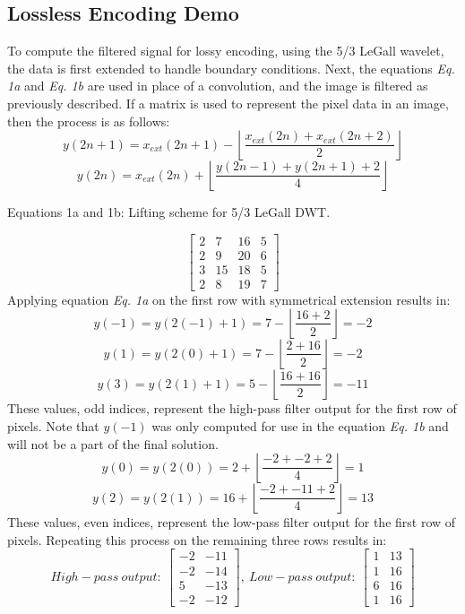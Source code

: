 \documentclass{article}
\begin{document}
\subsection{Lossless Encoding Demo}
To compute the filtered signal for lossy encoding, using the 5/3 LeGall wavelet, the data is first extended to handle boundary conditions. Next, the equations \textit{Eq. 1a} and \textit{Eq. 1b} are used in place of a convolution, and the image is filtered as previously described. If a matrix is used to represent the pixel data in an image, then the process is as follows: 
\[y(2n+1)=x_{ext}(2n+1)-\left\lfloor \frac{x_{ext}(2n)+x_{ext}(2n+2)}{2} \right\rfloor \tag{3}\]
\[y(2n)=x_{ext}(2n)+\left\lfloor \frac{y(2n-1)+y(2n+1)+2}{4} \right\rfloor \tag{3}\]
\begin{center}
    Equations 1a and 1b: Lifting scheme for 5/3 LeGall DWT.
\end{center}

\[
\begin{bmatrix}
2 & 7 & 16 & 5\\
2 & 9 & 20 & 6\\
3 & 15 & 18 & 5\\
2 & 8 & 19 & 7
\end{bmatrix}
\]
Applying equation \textit{Eq. 1a} on the first row with symmetrical extension results in:
\[
y(-1) = y(2(-1)+1)= 7-\left\lfloor \frac{16+2}{2} \right\rfloor = -2
\]
\[
y(1)=y(2(0)+1)=7-\left\lfloor \frac{2+16}{2} \right\rfloor = -2
\]
\[
y(3)=y(2(1)+1)=5-\left\lfloor \frac{16+16}{2} \right\rfloor = -11
\]
These values, odd indices, represent the high-pass filter output for the first row of pixels. Note that $y(-1)$ was only computed for use in the equation \textit{Eq. 1b} and will not be a part of the final solution. 
\[
y(0)=y(2(0)) = 2+ \left\lfloor \frac{-2+-2+2}{4} \right\rfloor = 1
\]
\[
y(2)=y(2(1))=16+\left\lfloor \frac{-2+-11+2}{4} \right\rfloor = 13
\]
These values, even indices, represent the low-pass filter output for the first row of pixels. Repeating this process on the remaining three rows results in:
\[
High-pass\ output:\ 
\begin{bmatrix}
    -2 & -11\\
    -2 & -14\\
     5 & -13 \\
    -2 & -12
\end{bmatrix}
,\ Low-pass\ output:\ 
\begin{bmatrix}
    1 & 13\\
    1 & 16\\
    6 & 16 \\
    1 & 16
\end{bmatrix}
\]
\end{document}
